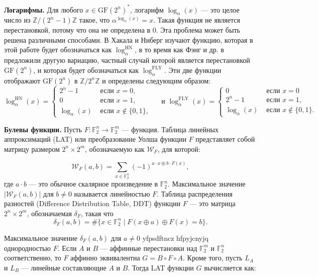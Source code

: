 \textbf{Логарифмы.} Для любого \(x \in \text{GF}(2^n)^*\), логарифм \(\log_\alpha(x)\) — это целое число из \(\mathbb{Z}/(2^n - 1)\mathbb{Z}\) такое, что \(\alpha^{\log_\alpha(x)} = x\). Такая функция не является перестановкой, потому что она не определена в 0. Эта проблема может быть решена различными способами. В \cite{HN10} Хакала и Ниберг изучают функцию, которая в этой работе будет обозначаться как \(\log_{\alpha}^{\text{HN}}\), в то время как Фэнг и др. в \cite{FLY09} предложили другую вариацию, частный случай которой является перестановкой \(\text{GF}(2^n)\), и которая будет обозначаться как \(\log_{\alpha}^{\text{FLY}}\). Эти две функции отображают \(\text{GF}(2^n)\) в \(\mathbb{Z}/2^n\mathbb{Z}\) и определены следующим образом:
$$
\log _\alpha^{\mathrm{HN}}(x)=\left\{\begin{array}{ll}
        2^n-1 & \text { если } x=0, \\
        0 & \text { если } x=1, \\
        \log _\alpha(x) & \text { если } x \notin\{0,1\},
        \end{array} \quad \text { и } \log _\alpha^{\mathrm{FLY}}(x)= \begin{cases}0 & \text { если } x=0 \\
        2^n-1 & \text { если } x=1, \\
        \log _\alpha(x) & \text { если } x \notin\{0,1\} .\end{cases}\right.
$$

\textbf{Булевы функции.} Пусть \( F : \mathbb{F}_2^n \rightarrow \mathbb{F}_2^m \) — функция. Таблица линейных аппроксимаций (LAT) или преобразование Уолша функции \( F \) представляет собой матрицу размером \( 2^n \times 2^m \), обозначаемую как \( \mathcal{W}_F \), для которой:

\[
\mathcal{W}_F(a, b) = \sum_{x \in \mathbb{F}_2^n} (-1)^{a \cdot x \oplus b \cdot F(x)},
\] где \( a \cdot b \) — это обычное скалярное произведение в \(\mathbb{F}_2^n\). Максимальное значение \(|\mathcal{W}_F(a, b)|\) для \(b \neq 0\) называется линейностью \( F \). Таблица распределения разностей (Difference Distribution Table, DDT) функции \( F \) — это матрица \( 2^n \times 2^m \), обозначаемая \(\delta_F\), такая что
\[
\delta_F(a, b) = \# \{ x \in \mathbb{F}_2^n \mid F(x \oplus a) \oplus F(x) = b \}.
\]

Максимальное значение \(\delta_F(a, b)\) для \(a \neq 0\) yfpsdftncz hfpyjcnyjq однородностью \( F \). Если \( A \) и \( B \) — аффинные перестановки над \(\mathbb{F}_2^m\) и \(\mathbb{F}_2^n\) соответственно, то \( F \) аффинно эквивалентна \( G = B \circ F \circ A \). Кроме того, пусть \( L_A \) и \( L_B \) — линейные составляющие \( A \) и \( B \). Тогда LAT функции \( G \) вычисляется как:

